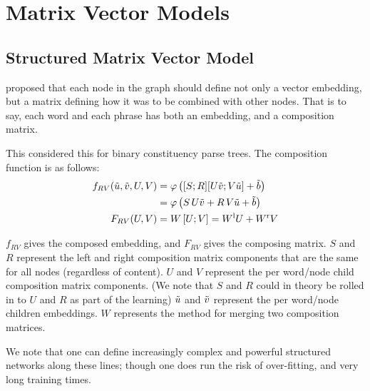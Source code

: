 \documentclass[12pt,parskip]{komatufte}
\begin{document}
\section{Matrix Vector Models}\label{sec:matrix-vector-models}
\subsection{Structured Matrix Vector Model}

 proposed that each node in the graph should define not only a vector embedding, but a matrix defining how it was to be combined with other nodes.
That is to say, each word and each phrase has both an embedding, and a composition matrix.

This considered this for binary constituency parse trees.
The composition function is as follows:
\begin{align}
f_{RV}(\v u, \v v, U, V) &= \varphi\left( [S;R][U\v v;V\v u] + \v b \right) \\ 
&= \varphi\left( S\,U\v v +R\,V\v u + \v b \right)\\
F_{RV}(U, V) &= W\left[U;V\right] = \d W_l U + \d W_r V
\end{align}


$f_{RV}$ gives the composed embedding, and $F_{RV}$ gives the composing matrix.
$S$ and $R$ represent the left and right composition matrix components that are the same for all nodes (regardless of content).
$U$ and $V$ represent the per word/node child composition matrix components.
(We note that $S$ and $R$ could in theory be rolled in to $U$ and $R$ as part of the learning)
$\tilde{u}$ and $\tilde{v}$ represent the per word/node children embeddings.
$W$ represents the method for merging two composition matrices.

We note that one can define increasingly complex and powerful structured networks along these lines; though one does run the risk of over-fitting, and very long training times.
\end{document}
